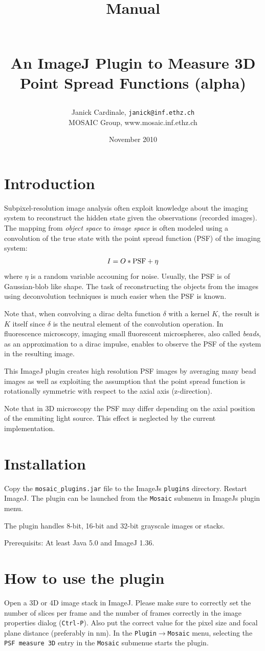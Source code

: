 \documentclass{scrartcl}
\title{\begin{small}Manual\end{small}\\An ImageJ Plugin to Measure 3D Point Spread Functions (alpha)}
\date{November 2010}
\author{Janick Cardinale, \texttt{janick@inf.ethz.ch}\\MOSAIC Group, www.mosaic.inf.ethz.ch}
\begin{document}
\maketitle

\section{Introduction}
\label{sec:intro}
Subpixel-resolution image analysis often exploit knowledge about the imaging system to reconstruct the hidden state given the observations (recorded images). The mapping from \textit{object space} to \textit{image space} is often modeled using a convolution of the true state with the point spread function (PSF) of the imaging system:
\[   
I = O * \textnormal{PSF} + \eta
\] 
where $\eta$ is a random variable accouning for noise. Usually, the PSF is of Gaussian-blob like shape. The task of reconstructing the objects from the images using deconvolution techniques is much easier when the PSF is known. 

Note that, when convolving a dirac delta function $\delta$ with a kernel $K$, the result is $K$ itself since $\delta$ is the neutral element of the convolution operation. In fluorescence microscopy, imaging small fluorescent microspheres, also called \textit{beads}, as an approximation to a dirac impulse, enables to observe the PSF of the system in the resulting image. 

This ImageJ plugin creates high resolution PSF images by averaging many bead images as well as exploiting the assumption that the point spread function is rotationally symmetric with respect to the axial axis (z-direction).

Note that in 3D microscopy the PSF may differ depending on the axial position of the emmiting light source. This effect is neglected by the current implementation.

\section{Installation}
Copy the \texttt{mosaic\_plugins.jar} file to the ImageJs \texttt{plugins} directory. Restart ImageJ. The plugin can be launched from the \texttt{Mosaic} submenu in ImageJs plugin menu. 

The plugin handles 8-bit, 16-bit and 32-bit grayscale images or stacks. 

Prerequisits: At least Java 5.0 and ImageJ 1.36.

\section{How to use the plugin}
Open a 3D or 4D image stack in ImageJ. Please make sure to correctly set the number of slices per frame and the number of frames correctly in the image properties dialog (\texttt{Ctrl-P}). Also put the correct value for the pixel size and focal plane distance (preferably in nm). In the \texttt{Plugin$\rightarrow$Mosaic} menu, selecting the \texttt{PSF measure 3D} entry in the \texttt{Mosaic} submenue starts the plugin. 
\end{document}
